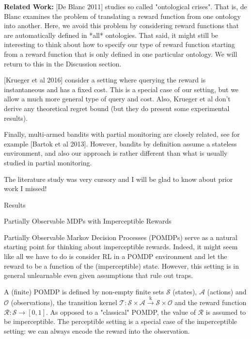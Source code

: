 \documentclass[a4paper]{article}
\newcommand{\Co}[1]{}
\newcommand{\San}[1]{}
\newcommand{\K}{\xrightarrow{\mathrm{k}}}
\newcommand{\St}{\mathcal{S}}
\newcommand{\A}{\mathcal{A}}
\newcommand{\Ob}{\mathcal{O}}
\newcommand{\R}{\mathcal{R}}
\newcommand{\T}{\mathcal{T}}
\begin{document}
\textbf{Related Work:}\Co{b} [De Blanc 2011]\San{(https://arxiv.org/abs/1105.3821)}\Co{s} studies so called "ontological crises". That is, de Blanc examines the problem of translating a reward function from one ontology into another. Here, we avoid this problem by considering reward functions that are automatically defined in *all* ontologies. That said, it might still be interesting to think about how to specify our type of reward function starting from a reward function that is only defined in one particular ontology. We will return to this in the Discussion section.

[Krueger et al 2016]\San{(https://pdfs.semanticscholar.org/a47f/52b25ce1e56a03876d9c0fd7c45e63270eb4.pdf)}\Co{s} consider a setting where querying the reward is instantaneous and has a fixed cost. This is a special case of our setting, but we allow a much more general type of query and cost. Also, Krueger et al don't derive any theoretical regret bound (but they do present some experimental results).

Finally, multi-armed bandits with partial monitoring are closely related, see for example [Bartok et al 2013]\San{(http://www.mit.edu/~rakhlin/papers/partial_monitoring.pdf)}\Co{s}. However, bandits by definition assume a stateless environment, and also our approach is rather different than what is usually studied in partial monitoring.

The literature study was very cursory and I will be glad to know about prior work I missed!

\begin{Huge}Results\end{Huge}

\begin{Large}Partially Observable MDPs with Imperceptible Rewards\end{Large}

Partially Observable Markov Decision Processes (POMDPs) serve as a natural starting point for thinking about imperceptible rewards. Indeed, it might seem like all we have to do is consider RL in a POMDP environment and let the reward to be a function of the (imperceptible) state. However, this setting is in general unlearnable even given assumptions that rule out traps.

A (finite) POMDP is defined by non-empty finite sets $\St$ (states), $\A$ (actions) and $\Ob$ (observations), the transition kernel $\T:\St\times\A\K\St\times\Ob$ and the reward function $\R:\St\rightarrow[0,1]$. As opposed to a "classical" POMDP, the value of $\R$ is assumed to be imperceptible. The perceptible setting is a special case of the imperceptible setting: we can always encode the reward into the observation.
\end{document}
